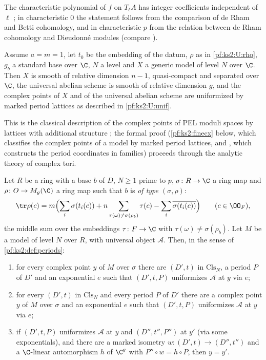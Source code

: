 The characteristic polynomial of $f$ on $T_\ell A$ has integer coefficients independent of $\ell$
\cite{Mumford1970}; in characteristic $0$ the statement follows from the comparison of de Rham and
Betti cohomology, and in characteristic $p$ from the relation between de Rham cohomology and
Dieudonn\'e modules \cite{Oda1969} (compare \cite{KatzMessing1974}).

\begin{littheorem}\label{pf:ks2:classical:unif}
Assume $a=m=1$, let $t_0$ be the embedding of the datum, $\rho$ as in \ref{pf:ks2:U:rho}, $g_b$ a
standard base over $\C$, $N$ a level and $X$ a generic model of level $N$ over $\C$. Then $X$ is smooth
of relative dimension $n-1$, quasi-compact and separated over $\C$, the universal abelian scheme is
smooth of relative dimension $g$, and the complex points of $X$ and of the universal abelian scheme are
uniformized by marked period lattices as described in \ref{pf:ks2:U:unif}.
\end{littheorem}

This is the classical description of the complex points of PEL moduli spaces by lattices with
additional structure \cite{Shimura1971,Kottwitz1992}; the formal proof
(\cref{pf:ks2:finecx} below, which classifies the complex points of a model by marked period
lattices, and , which
constructs the period coordinates in families) proceeds through the analytic theory of complex tori.

\begin{proposition}\label{pf:ks2:finecx}
Let $R$ be a ring with a base $b$ of $D$, $N\ge1$ prime to $p$, $\sigma\colon R\to\C$ a ring map and
$\rho\colon O\to M_g(\C)$ a ring map such that $b$ is \emph{of type $(\sigma,\rho)$}:
\[
\tr\rho(c)=m\Bigl(\sum_i\sigma(t_i(c))+n\sum_{\tau(\omega)\ne\sigma(\rho_b)}\tau(c)
-\sum_i\overline{\sigma(t_i(c))}\Bigr)\qquad(c\in\kstwoOF),
\]
the middle sum over the embeddings $\tau\colon F\to\C$ with $\tau(\omega)\ne\sigma(\rho_b)$. Let $M$
be a model of level $N$ over $R$, with universal object $\mathcal A$. Then, in the sense of
\cref{pf:ks2:def:periods}:
\begin{enumerate}
\item for every complex point $y$ of $M$ over $\sigma$ there are $(D',t)$ in $\mathrm{Cls}_N$, a period
  $P$ of $D'$ and an exponential $e$ such that $(D',t,P)$ uniformizes $\mathcal A$ at $y$ via $e$;
\item for every $(D',t)$ in $\mathrm{Cls}_N$ and every period $P$ of $D'$ there are a complex point $y$
  of $M$ over $\sigma$ and an exponential $e$ such that $(D',t,P)$ uniformizes $\mathcal A$ at $y$ via
  $e$;
\item if $(D',t,P)$ uniformizes $\mathcal A$ at $y$ and $(D'',t'',P'')$ at $y'$ (via some
  exponentials), and there are a marked isometry $w\colon(D',t)\to(D'',t'')$ and a $\C$-linear
  automorphism $h$ of $\C^g$ with $P''\circ w=h\circ P$, then $y=y'$.
\end{enumerate}
\end{proposition}

